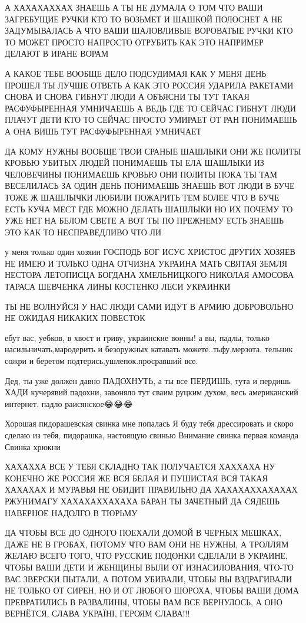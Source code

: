 А ХАХАХАХХАХ ЗНАЕШЬ А ТЫ НЕ ДУМАЛА О ТОМ ЧТО ВАШИ ЗАГРЕБУЩИЕ РУЧКИ КТО ТО
ВОЗЬМЕТ И ШАШКОЙ ПОЛОСНЕТ А НЕ ЗАДУМЫВАЛАСЬ А ЧТО ВАШИ ШАЛОВЛИВЫЕ ВОРОВАТЫЕ
РУЧКИ КТО ТО МОЖЕТ ПРОСТО НАПРОСТО ОТРУБИТЬ КАК ЭТО НАПРИМЕР ДЕЛАЮТ В ИРАНЕ
ВОРАМ

А КАКОЕ ТЕБЕ ВООБЩЕ ДЕЛО ПОДСУДИМАЯ КАК У МЕНЯ ДЕНЬ ПРОШЕЛ ТЫ ЛУЧШЕ ОТВЕТЬ А
КАК ЭТО РОССИЯ УДАРИЛА РАКЕТАМИ СНОВА И СНОВА ГИБНУТ ЛЮДИ А ОБЪЯСНИ ТЫ ТУТ
ТАКАЯ РАСФУФЫРЕННАЯ УМНИЧАЕШЬ А ВЕДЬ ГДЕ ТО СЕЙЧАС ГИБНУТ ЛЮДИ ПЛАЧУТ ДЕТИ КТО
ТО СЕЙЧАС ПРОСТО УМИРАЕТ ОТ РАН ПОНИМАЕШЬ А ОНА ВИШЬ ТУТ РАСФУФЫРЕННАЯ УМНИЧАЕТ

ДА КОМУ НУЖНЫ ВООБЩЕ ТВОИ СРАНЫЕ ШАШЛЫКИ ОНИ ЖЕ ПОЛИТЫ КРОВЬЮ УБИТЫХ ЛЮДЕЙ
ПОНИМАЕШЬ ТЫ ЕЛА ШАШЛЫКИ ИЗ ЧЕЛОВЕЧИНЫ ПОНИМАЕШЬ КРОВЬЮ ОНИ ПОЛИТЫ ПОКА ТЫ ТАМ
ВЕСЕЛИЛАСЬ ЗА ОДИН ДЕНЬ ПОНИМАЕШЬ ЗНАЕШЬ ВОТ ЛЮДИ В БУЧЕ ТОЖЕ Ж ШАШЛЫЧКИ ЛЮБИЛИ
ПОЖАРИТЬ ТЕМ БОЛЕЕ ЧТО В БУЧЕ ЕСТЬ КУЧА МЕСТ ГДЕ МОЖНО ДЕЛАТЬ ШАШЛЫКИ НО ИХ
ПОЧЕМУ ТО УЖЕ НЕТ НА БЕЛОМ СВЕТЕ А ВОТ ТЫ ПО ПРЕЖНЕМУ ЕСТЬ ЗНАЕШЬ ЭТО КАК ТО
НЕСПРАВЕДЛИВО ЧТО ЛИ

у меня только один хозяин ГОСПОДЬ БОГ ИСУС ХРИСТОС ДРУГИХ ХОЗЯЕВ НЕ ИМЕЮ И
ТОЛЬКО ОДНА ОТЧИЗНА УКРАИНА МАТЬ СВЯТАЯ ЗЕМЛЯ НЕСТОРА ЛЕТОПИСЦА БОГДАНА
ХМЕЛЬНИЦКОГО НИКОЛАЯ АМОСОВА ТАРАСА ШЕВЧЕНКА ЛИНЫ КОСТЕНКО ЛЕСИ УКРАИНКИ

ТЫ НЕ ВОЛНУЙСЯ У НАС ЛЮДИ САМИ ИДУТ В АРМИЮ ДОБРОВОЛЬНО НЕ ОЖИДАЯ НИКАКИХ
ПОВЕСТОК

ебут вас, уебков, в хвост и гриву, украинские воины! а вы, падлы, только
насильничать,мародерить и безоружных катавать можете..тьфу,мерзота. тельник
сожри и беретом подтерись,ушлепок.просравший все.

Дед, ты уже должен давно ПАДОХНУТЬ, а ты все ПЕРДИШЬ, тута и пердишь🤣🤣🤣ХАДИ
кучерявий падохни, завоняло тут сваим руцким духом, весь американский интернет,
падло раисянское😂😂😂

Хорошая пидорашевская свинка мне попалась Я буду тебя дрессировать и скоро
сделаю из тебя, пидорашка, настоящую свинью Внимание свинка первая команда
Свинка хрюкни

ХАХАХХА ВСЕ У ТЕБЯ СКЛАДНО ТАК ПОЛУЧАЕТСЯ ХАХХАХА НУ КОНЕЧНО ЖЕ РОССИЯ ЖЕ ВСЯ
БЕЛАЯ И ПУШИСТАЯ ВСЯ ТАКАЯ ХАХАХАХ И МУРАВЬЯ НЕ ОБИДИТ ПРАВИЛЬНО ДА
ХАХАХАХХАХАХАХ РЖУНИМАГУ ХАХАХАХХАХАХА БАРАН ТЫ ЗАЧЕТНЫЙ ДА СЯДЕШЬ НАВЕРНОЕ
НАДОЛГО В ТЮРЬМУ

ДА ЧТОБЫ ВСЕ ДО ОДНОГО ПОЕХАЛИ ДОМОЙ В ЧЕРНЫХ МЕШКАХ, ДАЖЕ НЕ В ГРОБАХ, ПОТОМУ
ЧТО ВАМ ОНИ НЕ НУЖНЫ, А ТРОЛЛЯМ ЖЕЛАЮ ВСЕГО ТОГО, ЧТО РУССКИЕ ПОДОНКИ СДЕЛАЛИ В
УКРАИНЕ, ЧТОБЫ ВАШИ ДЕТИ И ЖЕНЩИНЫ ВЫЛИ ОТ ИЗНАСИЛОВАНИЯ, ЧТО-ТО ВАС ЗВЕРСКИ
ПЫТАЛИ, А ПОТОМ УБИВАЛИ, ЧТОБЫ ВЫ ВЗДРАГИВАЛИ НЕ ТОЛЬКО ОТ СИРЕН, НО И ОТ
ЛЮБОГО ШОРОХА, ЧТОБЫ ВАШИ ДОМА ПРЕВРАТИЛИСЬ В РАЗВАЛИНЫ, ЧТОБЫ ВАМ ВСЕ
ВЕРНУЛОСЬ, А ОНО ВЕРНЁТСЯ, СЛАВА УКРАЇНІ, ГЕРОЯМ СЛАВА!!!

